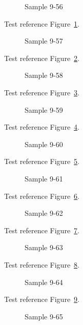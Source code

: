 \begin{figure}[tbhp]
\caption{Sample 9-56}
\label{fig:sample-9-56}
\end{figure}

Test reference Figure~\ref{fig:sample-9-56}.

\begin{figure}[tbhp]
\caption{Sample 9-57}
\label{fig:sample-9-57}
\end{figure}

Test reference Figure~\ref{fig:sample-9-57}.

\begin{figure}[tbhp]
\caption{Sample 9-58}
\label{fig:sample-9-58}
\end{figure}

Test reference Figure~\ref{fig:sample-9-58}.

\begin{figure}[tbhp]
\caption{Sample 9-59}
\label{fig:sample-9-59}
\end{figure}

Test reference Figure~\ref{fig:sample-9-59}.

\begin{figure}[tbhp]
\caption{Sample 9-60}
\label{fig:sample-9-60}
\end{figure}

Test reference Figure~\ref{fig:sample-9-60}.

\begin{figure}[tbhp]
\caption{Sample 9-61}
\label{fig:sample-9-61}
\end{figure}

Test reference Figure~\ref{fig:sample-9-61}.

\begin{figure}[tbhp]
\caption{Sample 9-62}
\label{fig:sample-9-62}
\end{figure}

Test reference Figure~\ref{fig:sample-9-62}.

\begin{figure}[tbhp]
\caption{Sample 9-63}
\label{fig:sample-9-63}
\end{figure}

Test reference Figure~\ref{fig:sample-9-63}.

\begin{figure}[tbhp]
\caption{Sample 9-64}
\label{fig:sample-9-64}
\end{figure}

Test reference Figure~\ref{fig:sample-9-64}.

\begin{figure}[tbhp]
\caption{Sample 9-65}
\label{fig:sample-9-65}
\end{figure}

